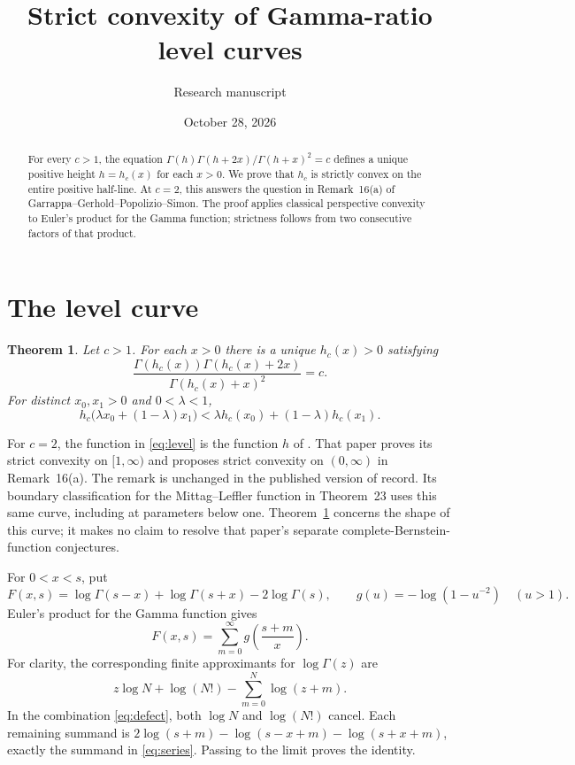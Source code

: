\documentclass[11pt]{article}
\title{Strict convexity of Gamma-ratio level curves}
\author{Research manuscript}
\date{October 28, 2026}
\newtheorem{theorem}{Theorem}
\begin{document}
\maketitle
\begin{abstract}
For every $c>1$, the equation
$\Gamma(h)\Gamma(h+2x)/\Gamma(h+x)^2=c$ defines a unique positive height
$h=h_c(x)$ for each $x>0$. We prove that $h_c$ is strictly convex on the
entire positive half-line. At $c=2$, this answers the question in Remark~16(a)
of Garrappa--Gerhold--Popolizio--Simon. The proof applies classical
perspective convexity to Euler's product for the Gamma function; strictness
follows from two consecutive factors of that product.
\end{abstract}

\section{The level curve}
\begin{theorem}\label{thm:main}
Let $c>1$. For each $x>0$ there is a unique $h_c(x)>0$ satisfying
\begin{equation}\label{eq:level}
 \frac{\Gamma(h_c(x))\Gamma(h_c(x)+2x)}{\Gamma(h_c(x)+x)^2}=c.
\end{equation}
For distinct $x_0,x_1>0$ and $0<\lambda<1$,
\[
 h_c\bigl(\lambda x_0+(1-\lambda)x_1\bigr)
 <\lambda h_c(x_0)+(1-\lambda)h_c(x_1).
\]
\end{theorem}

For $c=2$, the function in \eqref{eq:level} is the function $h$ of
\cite[Lemma~15]{GGPS}. That paper proves its strict convexity on
$[1,\infty)$ and proposes strict convexity on $(0,\infty)$ in
Remark~16(a). The remark is unchanged in the published version of record.
Its boundary classification for the Mittag--Leffler function in
Theorem~23 uses this same curve, including at parameters below one.
Theorem~\ref{thm:main} concerns the shape of this curve; it makes no claim
to resolve that paper's separate complete-Bernstein-function conjectures.

For $0<x<s$, put
\begin{equation}\label{eq:defect}
 F(x,s)=\log\Gamma(s-x)+\log\Gamma(s+x)-2\log\Gamma(s),
 \qquad g(u)=-\log(1-u^{-2})\quad(u>1).
\end{equation}
Euler's product for the Gamma function gives
\begin{equation}\label{eq:series}
 F(x,s)=\sum_{m=0}^{\infty}g\!\left(\frac{s+m}{x}\right).
\end{equation}
For clarity, the corresponding finite approximants for $\log\Gamma(z)$
are
\[
 z\log N+\log(N!)-\sum_{m=0}^{N}\log(z+m).
\]
In the combination \eqref{eq:defect}, both $\log N$ and $\log(N!)$
cancel. Each remaining summand is
$2\log(s+m)-\log(s-x+m)-\log(s+x+m)$, exactly the summand in
\eqref{eq:series}. Passing to the limit proves the identity.
\end{document}
